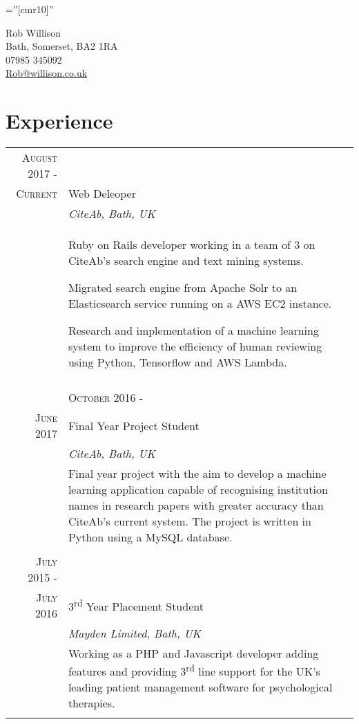 \documentclass[a4paper,12pt]{article}
\begin{document}
\pagestyle{empty} %

\font\fb=''[cmr10]'' %


\par{\centering
		{\LARGE Rob Willison\\
		\small Bath, Somerset, BA2 1RA\\
		07985 345092\\
		\href{mailto:Rob@willison.co.uk}{Rob@willison.co.uk
	}\bigskip\par}

\section{Experience}
\begin{tabular}{rp{11cm}}
\textsc{August} 2017 -\\ \textsc{Current} & Web Deleoper
\\&\emph{CiteAb, Bath, UK}\\ &
\footnotesize{Ruby on Rails developer working in a team of 3 on CiteAb's search engine and
text mining systems.\par
Migrated search engine from Apache Solr to an Elasticsearch service running on a AWS EC2 instance.\par
Research and implementation of a machine learning system to improve the efficiency of human reviewing using Python, Tensorflow and AWS Lambda.
}\\\multicolumn{2}{c}{} \\ &

\textsc{October} 2016 -\\ \textsc{June} 2017 & Final Year Project Student
\\&\emph{CiteAb, Bath, UK}\\ &
\footnotesize{Final year project with the aim to develop a machine learning application capable of recognising institution names
 in research papers with greater accuracy than CiteAb's current system. The project is written in Python using a  MySQL database.}\\\multicolumn{2}{c}{} \\

\textsc{July} 2015 -\\ \textsc{July} 2016 & 3\textsuperscript{rd} Year Placement Student \\&\emph{Mayden Limited, Bath, UK}\\&\footnotesize{Working as a PHP and Javascript developer adding features and providing 3\textsuperscript{rd} line support for the UK's leading patient management software for psychological therapies.}\\\multicolumn{2}{c}{} \\
\end{tabular}

}
\end{document}
